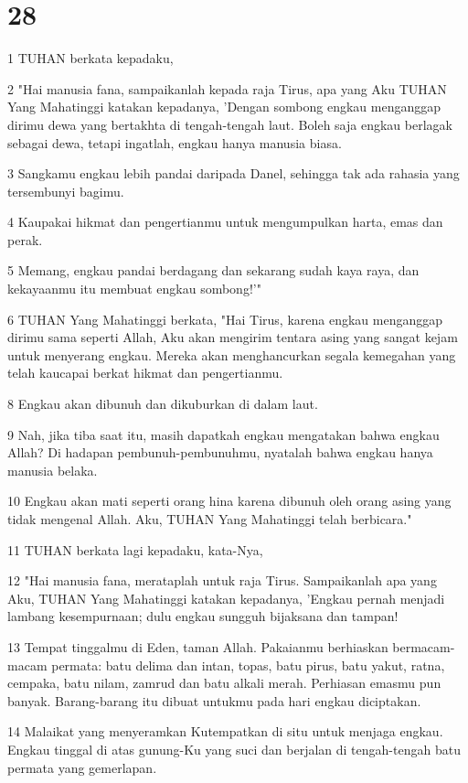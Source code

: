 \chapter{28}

\par 1 TUHAN berkata kepadaku,
\par 2 "Hai manusia fana, sampaikanlah kepada raja Tirus, apa yang Aku TUHAN Yang Mahatinggi katakan kepadanya, 'Dengan sombong engkau menganggap dirimu dewa yang bertakhta di tengah-tengah laut. Boleh saja engkau berlagak sebagai dewa, tetapi ingatlah, engkau hanya manusia biasa.
\par 3 Sangkamu engkau lebih pandai daripada Danel, sehingga tak ada rahasia yang tersembunyi bagimu.
\par 4 Kaupakai hikmat dan pengertianmu untuk mengumpulkan harta, emas dan perak.
\par 5 Memang, engkau pandai berdagang dan sekarang sudah kaya raya, dan kekayaanmu itu membuat engkau sombong!'"
\par 6 TUHAN Yang Mahatinggi berkata, "Hai Tirus, karena engkau menganggap dirimu sama seperti Allah, Aku akan mengirim tentara asing yang sangat kejam untuk menyerang engkau. Mereka akan menghancurkan segala kemegahan yang telah kaucapai berkat hikmat dan pengertianmu.
\par 8 Engkau akan dibunuh dan dikuburkan di dalam laut.
\par 9 Nah, jika tiba saat itu, masih dapatkah engkau mengatakan bahwa engkau Allah? Di hadapan pembunuh-pembunuhmu, nyatalah bahwa engkau hanya manusia belaka.
\par 10 Engkau akan mati seperti orang hina karena dibunuh oleh orang asing yang tidak mengenal Allah. Aku, TUHAN Yang Mahatinggi telah berbicara."
\par 11 TUHAN berkata lagi kepadaku, kata-Nya,
\par 12 "Hai manusia fana, merataplah untuk raja Tirus. Sampaikanlah apa yang Aku, TUHAN Yang Mahatinggi katakan kepadanya, 'Engkau pernah menjadi lambang kesempurnaan; dulu engkau sungguh bijaksana dan tampan!
\par 13 Tempat tinggalmu di Eden, taman Allah. Pakaianmu berhiaskan bermacam-macam permata: batu delima dan intan, topas, batu pirus, batu yakut, ratna, cempaka, batu nilam, zamrud dan batu alkali merah. Perhiasan emasmu pun banyak. Barang-barang itu dibuat untukmu pada hari engkau diciptakan.
\par 14 Malaikat yang menyeramkan Kutempatkan di situ untuk menjaga engkau. Engkau tinggal di atas gunung-Ku yang suci dan berjalan di tengah-tengah batu permata yang gemerlapan.
